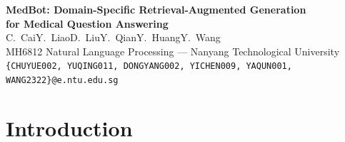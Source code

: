 \documentclass[11pt,a4paper]{article}
\begin{document}
\begin{center}
    {\Large\bfseries MedBot: Domain-Specific Retrieval-Augmented Generation\\[4pt]
    for Medical Question Answering}\\[12pt]
    {\normalsize C.~Cai\quad Y.~Liao\quad D.~Liu\quad Y.~Qian\quad Y.~Huang\quad Y.~Wang}\\[4pt]
    {\small MH6812 Natural Language Processing --- Nanyang Technological University}\\[4pt]
    {\footnotesize\texttt{\{CHUYUE002, YUQING011, DONGYANG002, YICHEN009, YAQUN001, WANG2322\}@e.ntu.edu.sg}}
\end{center}

\vspace{6pt}

\begin{abstract}
Large language models frequently hallucinate on medical queries, generating plausible but unsupported claims that pose risks in health-related settings. We present MedBot, a retrieval-augmented generation (RAG) system for medical question answering that grounds responses in domain-specific evidence. MedBot uses PubMedBERT-based sentence embeddings for semantic retrieval over four medical knowledge bases (70,000+ documents), combined with a confidence-scoring mechanism that triggers cross-collection fallback when retrieval quality is low. Structured prompt engineering further constrains the LLM to cite retrieved evidence and acknowledge uncertainty. In our evaluation, PubMedBERT embeddings outperform general-purpose MiniLM by +0.37 mean cosine similarity on medical synonym pairs, the retrieval pipeline achieves Recall@3 of 94.7\% and MRR of 0.906 across 300 test queries on the full 70K+ corpus, and the confidence scoring mechanism correctly identifies out-of-domain queries to prevent hallucination.
\end{abstract}

\section{Introduction}
\end{document}
